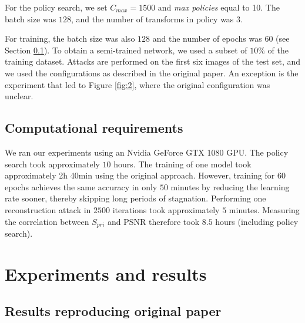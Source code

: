 For the policy search, we set $C_{max} = 1500$ and \emph{max policies} equal to 10. The batch size was $128$, and the number of transforms in policy was $3$.

For training, the batch size was also $128$ and the number of epochs was $60$ (see Section \ref{section:computational-requirements}). To obtain a semi-trained network, we used a subset of $10\%$ of the training dataset. Attacks are performed on the first six images of the test set, and we used the configurations as described in the original paper. An exception is the experiment that led to Figure \ref{fig:2}, where the original configuration was unclear.

\subsection{Computational requirements}
\label{section:computational-requirements}

We ran our experiments using an Nvidia GeForce GTX 1080 GPU. The policy search took approximately $10$ hours. The training of one model took approximately 2h 40min using the original approach. However, training for $60$ epochs achieves the same accuracy in only $50$ minutes by reducing the learning rate sooner, thereby skipping long periods of stagnation. Performing one reconstruction attack in $2500$ iterations took approximately $5$ minutes. Measuring the correlation between $S_{pri}$ and PSNR therefore took $8.5$ hours (including policy search).


\section{Experiments and results}
\label{sec:results}

\subsection{Results reproducing original paper}

